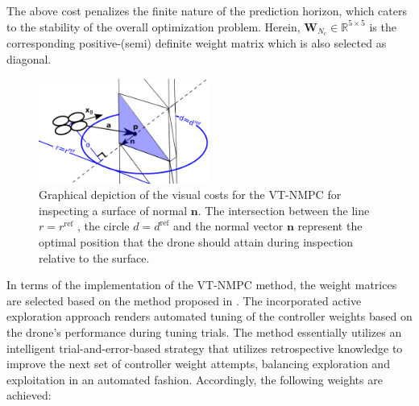 %
The above cost penalizes the finite nature of the prediction horizon, which caters to the stability of the overall optimization problem. Herein, $ \mathbf{W}_{N_c} \in \mathbb{R}^ {5 \times 5} $ is the corresponding positive-(semi) definite weight matrix which is also selected as diagonal. 
\begin{figure}
    \centering
    \includegraphics[width=0.5\textwidth]{figures/vtmpc_overview_1.pdf}
    \caption{Graphical depiction of the visual costs for the VT-NMPC for inspecting a surface of normal $\mathbf{n}$. The intersection between the line $r=r^\textrm{ref}$ , the circle $d=d^\textrm{ref}$ and the normal vector $\mathbf{n}$ represent the optimal position that the drone should attain during inspection relative to the surface. }
    \label{fig:methodoverview}  
\end{figure}
In terms of the implementation of the \ac{VT-NMPC} method, the weight matrices are selected based on the method proposed in \cite{deepmodel_mohit}. The incorporated active exploration approach renders automated tuning of the controller weights based on the drone’s performance during tuning trials. The method essentially utilizes an intelligent trial-and-error-based strategy that utilizes retrospective knowledge to improve the next set of controller weight attempts, balancing exploration and exploitation in an automated fashion. Accordingly, the following weights are achieved:
